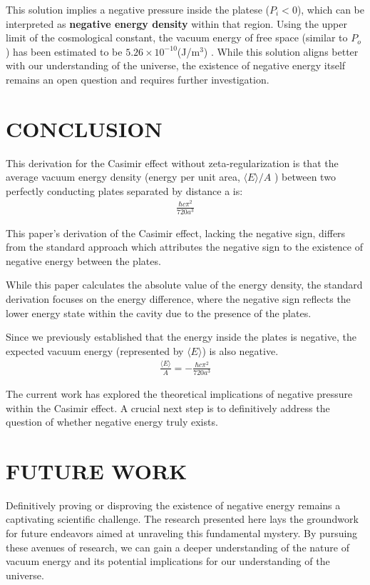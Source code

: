 \documentclass[aip,apl,amsmath,amssymb,reprint]{revtex4-2}
\begin{document}
This solution implies a negative pressure inside the platese ($P_i < 0$), 
which can be interpreted as \textbf{negative energy density} within that region.
Using the upper limit of the cosmological constant, 
the vacuum energy of free space (similar to $P_o$) has been estimated to be $5.26\times10^{-10}$(J/m$^3$)  \citep*{collaboration2020planck}.
While this solution aligns better with our understanding of the universe, 
the existence of negative energy itself remains an open question and requires further investigation.


\section{CONCLUSION}


This derivation for the Casimir effect without zeta-regularization is that the average vacuum energy density 
(energy per unit area, \(\langle E \rangle/A\) ) between two perfectly conducting plates separated by distance a is:
\begin{align}\frac{\hbar c \pi^2}{720 a^3}\end{align}

This paper's derivation of the Casimir effect, lacking the negative sign,  
differs from the standard approach which attributes the negative sign to the existence of negative energy between the plates. 

While this paper calculates the absolute value of the energy density, the standard derivation focuses on the energy difference, 
where the negative sign reflects the lower energy state within the cavity due to the presence of the plates.

Since we previously established that the energy inside the plates is negative, 
the expected vacuum energy (represented by $\langle E \rangle$) is also negative.
\begin{align}
    \frac{\langle E \rangle}{A} = -\frac{\hbar c \pi^2}{720 a^3}
\end{align}

The current work has explored the theoretical implications of negative pressure within the Casimir effect. 
A crucial next step is to definitively address the question of whether negative energy truly exists.


\section{FUTURE WORK}
Definitively proving or disproving the existence of negative energy remains a captivating scientific challenge. 
The research presented here lays the groundwork for future endeavors aimed at unraveling this fundamental mystery. 
By pursuing these avenues of research, we can gain a deeper understanding of the nature 
of vacuum energy and its potential implications for our understanding of the universe.
\end{document}
